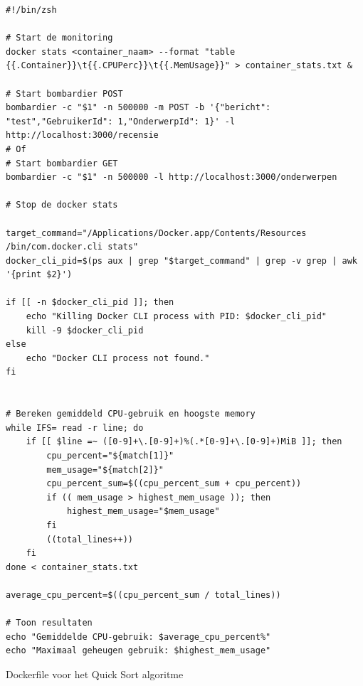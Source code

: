 \begin{listing}[H]
  \centering
  \begin{verbatim}
#!/bin/zsh

# Start de monitoring
docker stats <container_naam> --format "table {{.Container}}\t{{.CPUPerc}}\t{{.MemUsage}}" > container_stats.txt &

# Start bombardier POST
bombardier -c "$1" -n 500000 -m POST -b '{"bericht": "test","GebruikerId": 1,"OnderwerpId": 1}' -l http://localhost:3000/recensie
# Of
# Start bombardier GET
bombardier -c "$1" -n 500000 -l http://localhost:3000/onderwerpen

# Stop de docker stats

target_command="/Applications/Docker.app/Contents/Resources
/bin/com.docker.cli stats"
docker_cli_pid=$(ps aux | grep "$target_command" | grep -v grep | awk '{print $2}')

if [[ -n $docker_cli_pid ]]; then
    echo "Killing Docker CLI process with PID: $docker_cli_pid"
    kill -9 $docker_cli_pid
else
    echo "Docker CLI process not found."
fi


# Bereken gemiddeld CPU-gebruik en hoogste memory
while IFS= read -r line; do
    if [[ $line =~ ([0-9]+\.[0-9]+)%(.*[0-9]+\.[0-9]+)MiB ]]; then
        cpu_percent="${match[1]}"
        mem_usage="${match[2]}"
        cpu_percent_sum=$((cpu_percent_sum + cpu_percent))
        if (( mem_usage > highest_mem_usage )); then
            highest_mem_usage="$mem_usage"
        fi
        ((total_lines++))
    fi
done < container_stats.txt

average_cpu_percent=$((cpu_percent_sum / total_lines))

# Toon resultaten
echo "Gemiddelde CPU-gebruik: $average_cpu_percent%"
echo "Maximaal geheugen gebruik: $highest_mem_usage"

      \end{verbatim}
      \caption{\label{code:zshscript}Dockerfile voor het Quick Sort algoritme}
\end{listing}

